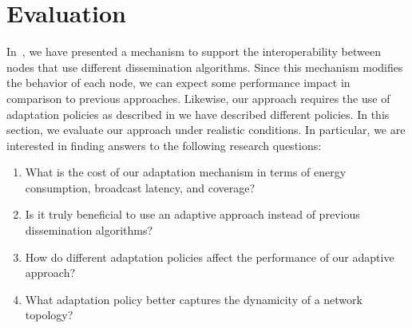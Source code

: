 
\section{Evaluation}



In~, we have presented a mechanism to support the interoperability between nodes that use different dissemination algorithms.
%
Since this mechanism modifies the behavior of each node, we can expect some performance impact in comparison to previous approaches.
%
Likewise, our approach requires the use of adaptation policies as described in  we have described different policies.
%
In this section, we evaluate our approach under realistic conditions.
%
In particular, we are interested in finding answers to the following research questions:


\begin{enumerate}
	\item[\textit{RQ1}] What is the cost of our adaptation mechanism in terms of energy consumption, broadcast latency, and coverage?
	\item[\textit{RQ2}] Is it truly beneficial to use an adaptive approach instead of previous dissemination algorithms?
	\item[\textit{RQ3}] How do different adaptation policies affect the performance of our adaptive approach?
	\item[\textit{RQ4}] What adaptation policy better captures the dynamicity of a network topology?
\end{enumerate}

